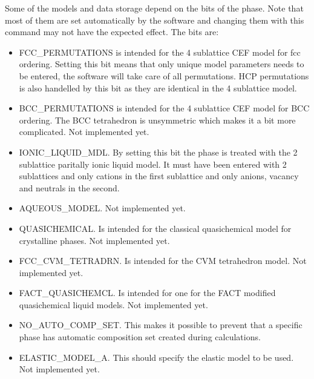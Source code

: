 \documentclass[12pt]{article}
\begin{document}
Some of the models and data storage depend on the bits of the phase.
Note that most of them are set automatically by the software and
changing them with this command may not have the expected effect.  The
bits are:

\begin{itemize}
\item FCC\_PERMUTATIONS is intended for the 4 sublattice CEF model for
fcc ordering.  Setting this bit means that only unique model
parameters needs to be entered, the software will take care of all
permutations.  HCP permutations is also handelled by this bit as they
are identical in the 4 sublattice model.

\item BCC\_PERMUTATIONS is intended for the 4 sublattice CEF model for
BCC ordering.  The BCC tetrahedron is unsymmetric which makes it a bit
more complicated.  Not implemented yet.

\item IONIC\_LIQUID\_MDL.  By setting this bit the phase is treated
with the 2 sublattice paritally ionic liquid model.  It must have been
entered with 2 sublattices and only cations in the first sublattice
and only anions, vacancy and neutrals in the second.

\item AQUEOUS\_MODEL. Not implemented yet.

\item QUASICHEMICAL. Is intended for the classical quasichemical
model for crystalline phases.  Not implemented yet.

\item FCC\_CVM\_TETRADRN.  Is intended for the CVM tetrahedron model.
Not implemented yet.

\item FACT\_QUASICHEMCL.  Is intended for one for the FACT modified
quasichemical liquid models.  Not implemented yet.

\item NO\_AUTO\_COMP\_SET.  This makes it possible to prevent that a
specific phase has automatic composition set created during
calculations.

\item ELASTIC\_MODEL\_A.  This should specify the elastic model to be
used.  Not implemented yet.
\end{itemize}
\end{document}
